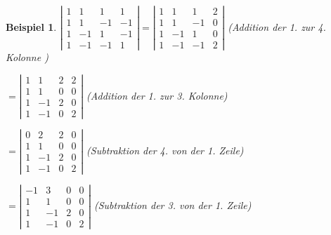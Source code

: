 \documentclass[a4paper,10pt]{report}
\newtheorem{myexample}{Beispiel}
\begin{document}
\begin{myexample}
$ \left | \begin {array}{rrrr}  1 & 1 & 1  & 1\\
                                1 & 1 & -1 & -1\\
                                1 & -1 & 1 & -1\\
                                1 & -1 & -1 & 1 \end{array} \right | =
 \left | \begin {array}{rrrr}  1 & 1 & 1  & 2\\
                                1 & 1 & -1 & 0\\
                                1 & -1 & 1 & 0\\
                                1 & -1 & -1 & 2 \end{array} \right
                                |$ (Addition der 1. zur 4. Kolonne
                                )
\vspace{0.4cm}

\hspace{0.8cm}  $ = \left | \begin {array}{rrrr}  1 & 1 & 2  & 2\\
                                1 & 1 & 0 & 0\\
                                1 & -1 & 2 & 0\\
                                1 & -1 & 0 & 2 \end{array} \right
                                |$ (Addition der 1. zur 3. Kolonne)

\vspace{0.4cm}

\hspace{0.8cm}  $ = \left | \begin {array}{rrrr}  0 & 2 & 2  & 0\\
                                1 & 1 & 0 & 0\\
                                1 & -1 & 2 & 0\\
                                1 & -1 & 0 & 2 \end{array} \right
                                |$ (Subtraktion der 4. von der 1. Zeile)

\vspace{0.4cm}

\hspace{0.8cm}  $ = \left | \begin {array}{rrrr}  -1 & 3 & 0  & 0\\
                                1 & 1 & 0 & 0\\
                                1 & -1 & 2 & 0\\
                                1 & -1 & 0 & 2 \end{array} \right
                                |$ (Subtraktion der 3. von der 1. Zeile)



\end{myexample}
\end{document}
